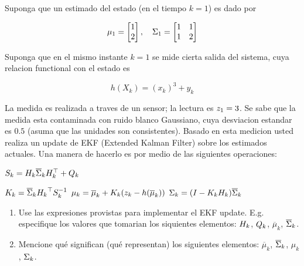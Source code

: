 \documentclass[parcial]{lcc}
\begin{document}
Suponga que un estimado del estado (en el tiempo $k = 1$) es dado por

\begin{equation*}
\mu_{1} = \begin{bmatrix} 1 \\ 2 \end{bmatrix}, \quad \Sigma_{1} = \begin{bmatrix} 1 & 1 \\ 1 & 2 \end{bmatrix}    
\end{equation*}

Suponga que en el mismo instante $k=1$ se mide cierta salida del sistema, cuya relacion functional con el estado es

\begin{equation*}
    h\left(X_{k}\right) = \left(x_{k}\right)^3 + y_{k}
\end{equation*}

La medida es realizada a traves de un sensor; la lectura es $z_{1} = 3$. Se sabe que la medida esta contaminada con ruido blanco Gaussiano, cuya desviacion estandar es $0.5$ (asuma que las unidades son consistentes). Basado en esta medicion usted realiza un update de EKF (Extended Kalman Filter) sobre los estimados actuales. Una manera de hacerlo es por medio de las siguientes operaciones:

    \begin{algorithmic}[1]
        \State $S_{k} = H_{k} \overline{\Sigma}_{k} H_{k}^{\top} + Q_{k} $

        \State $K_{k} = \overline{\Sigma}_{k} {H_{k}}^{\top} S_{k}^{-1} $
        \State $\mu_{k} = \overline{\mu}_{k} + K_{k}(z_{k} - h(\overline{\mu}_{k}))$
        \State $\Sigma_{k} = (I - K_{k}H_{k})\overline{\Sigma}_{k}$
    \end{algorithmic}

    \begin{enumerate}
        \item Use las expresiones provistas para implementar el EKF update. E.g. especifique los valores que tomarian los siquientes elementos: $H_{k}$, $Q_{k}$, $\overline{\mu}_{k}$, $\overline{\Sigma}_{k}$.
        \item Mencione qué significan (qué representan) los siguientes elementos: $\overline{\mu}_{k}$, $\overline{\Sigma}_{k}$, $\mu_{k}$, $\Sigma_{k}$.
    \end{enumerate}
\end{document}
